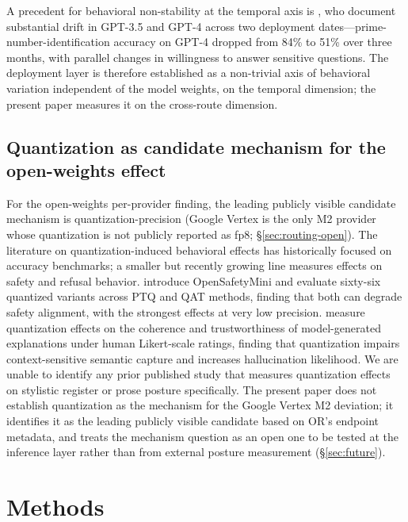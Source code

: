\documentclass[11pt,a4paper]{article}
\begin{document}
A precedent for behavioral non-stability at the temporal axis is \citet{chen2023chatgpt}, who document substantial drift in GPT-3.5 and GPT-4 across two deployment dates---prime-number-identification accuracy on GPT-4 dropped from 84\% to 51\% over three months, with parallel changes in willingness to answer sensitive questions. The deployment layer is therefore established as a non-trivial axis of behavioral variation independent of the model weights, on the temporal dimension; the present paper measures it on the cross-route dimension.

\subsection{Quantization as candidate mechanism for the open-weights effect}

For the open-weights per-provider finding, the leading publicly visible candidate mechanism is quantization-precision (Google Vertex is the only M2 provider whose quantization is not publicly reported as fp8; \S\ref{sec:routing-open}). The literature on quantization-induced behavioral effects has historically focused on accuracy benchmarks; a smaller but recently growing line measures effects on safety and refusal behavior. \citet{rajendra2025opensafetymini} introduce OpenSafetyMini and evaluate sixty-six quantized variants across PTQ and QAT methods, finding that both can degrade safety alignment, with the strongest effects at very low precision. \citet{wang2025compressedlens} measure quantization effects on the coherence and trustworthiness of model-generated explanations under human Likert-scale ratings, finding that quantization impairs context-sensitive semantic capture and increases hallucination likelihood. We are unable to identify any prior published study that measures quantization effects on stylistic register or prose posture specifically. The present paper does not establish quantization as the mechanism for the Google Vertex M2 deviation; it identifies it as the leading publicly visible candidate based on OR's endpoint metadata, and treats the mechanism question as an open one to be tested at the inference layer rather than from external posture measurement (\S\ref{sec:future}).

\section{Methods}
\label{sec:methods}
\end{document}

